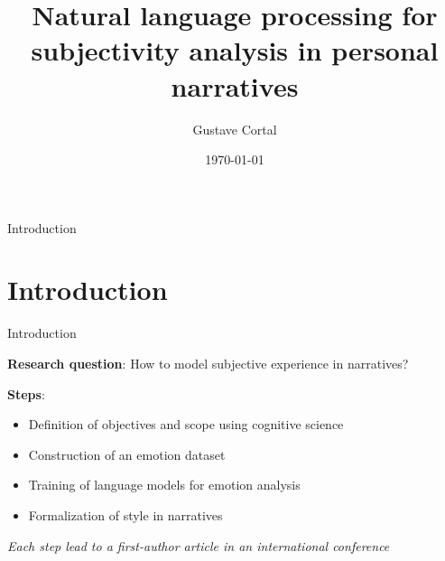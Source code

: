 \documentclass[handout,10pt]{beamer}
\title{Natural language processing for\\ subjectivity analysis in personal narratives}
\author{Gustave Cortal}
\date{\today}
\begin{document}
\setlength{\parskip}{5pt}%
\setlength{\parsep}{0pt}%
\setlength{\itemsep}{0.25cm}%
\setlength{\leftmargini}{0.5cm}

\begin{frame}
  \titlepage
\end{frame}

\begin{frame}{}
\Large
\begin{center}
    Introduction
    \section{Introduction}
\end{center}
\end{frame}


\begin{frame}{Introduction}




\pause

\textbf{Research question}: How to model subjective experience in narratives?


\vspace{0.5cm}
\pause

\textbf{Steps}:

\begin{itemize}[<+->]
    \item Definition of objectives and scope using cognitive science
    \item Construction of an emotion dataset 
    \item Training of language models for emotion analysis 
    \item Formalization of style in narratives 
\end{itemize}

\vspace{0.5cm}
\pause

\small

\textit{Each step lead to a first-author article in an international conference} %

    
\end{frame}
\end{document}
